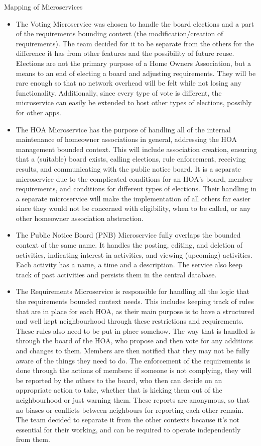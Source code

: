 \documentclass{article}
\begin{document}
\begin{section}{Mapping of Microservices }
\begin{itemize}
        \item The Voting Microservice was chosen to handle the board elections and a part of the requirements bounding context (the modification/creation of requirements). The team decided for it to be separate from the others for the difference it has from other features and the possibility of future reuse. Elections are not the primary purpose of a Home Owners Association, but a means to an end of electing a board and adjusting requirements. They will be rare enough so that no network overhead will be felt while not losing any functionality. Additionally, since every type of vote is different, the microservice can easily be extended to host other types of elections, possibly for other apps.
        \item The HOA Microservice has the purpose of handling all of the internal maintenance of homeowner associations in general, addressing the HOA management bounded context. This will include association creation, ensuring that a (suitable) board exists, calling elections, rule enforcement, receiving results, and communicating with the public notice board. It is a separate microservice due to the complicated conditions for an HOA’s board, member requirements, and conditions for different types of elections. Their handling in a separate microservice will make the implementation of all others far easier since they would not be concerned with eligibility, when to be called, or any other homeowner association abstraction.
        \item The Public Notice Board (PNB) Microservice fully overlaps the bounded context of the same name. It handles the posting, editing, and deletion of activities, indicating interest in activities, and viewing (upcoming) activities. Each activity has a name, a time and a description. The service also keep track of past activities and persists them in the central database.
        \item The Requirements Microservice is responsible for handling all the logic that the requirements bounded context needs. This includes keeping track of rules that are in place for each HOA, as their main purpose is to have a structured and well kept neighbourhood through these restrictions and requirements. These rules also need to be put in place somehow. The way that is handled is through the board of the HOA, who propose and then vote for any additions and changes to them. Members are then notified that they may not be fully aware of the things they need to do. The enforcement of the requirements is done through the actions of members: if someone is not complying, they will be reported by the others to the board, who then can decide on an appropriate action to take, whether that is kicking them out of the neighbourhood or just warning them. These reports are anonymous, so that no biases or conflicts between neighbours for reporting each other remain. The team decided to separate it from the other contexts because it’s not essential for their  working, and can be required to operate independently from them.
    \end{itemize}

\end{section}
\end{document}
